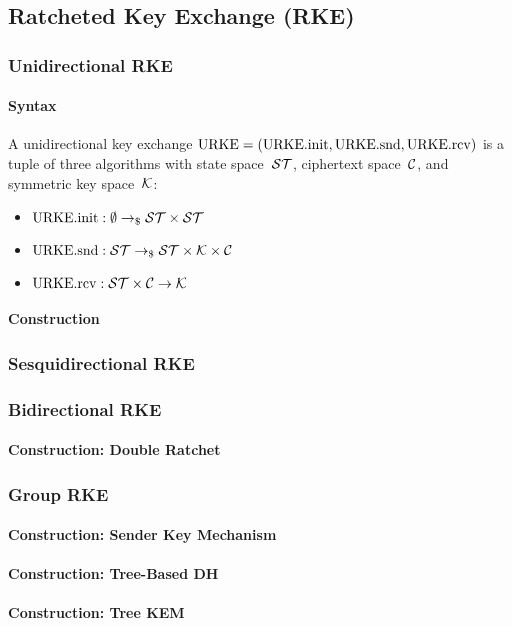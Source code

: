 \documentclass[a4paper,orivec]{llncs}
\begin{document}
\subsection{Ratcheted Key Exchange (RKE)}

\subsubsection{Unidirectional RKE}

\paragraph{Syntax}
A unidirectional key exchange $\mathrm{URKE}=(\mathrm{URKE}.\mathrm{init},\mathrm{URKE}.\mathrm{snd},\mathrm{URKE}.\mathrm{rcv})$ is a tuple of three algorithms with state space~$\mathcal{ST}$, ciphertext space~$\mathcal{C}$, and symmetric key space~$\mathcal{K}$:

\begin{itemize}
    \item $\mathrm{URKE}.\mathrm{init}: \emptyset \to_\$ \mathcal{ST}\times\mathcal{ST}$
    \item $\mathrm{URKE}.\mathrm{snd}: \mathcal{ST} \to_\$ \mathcal{ST}\times\mathcal{K}\times\mathcal{C}$
    \item $\mathrm{URKE}.\mathrm{rcv}: \mathcal{ST}\times\mathcal{C} \to \mathcal{K}$
\end{itemize}

\paragraph{Construction}

\subsubsection{Sesquidirectional RKE}

\subsubsection{Bidirectional RKE}

\paragraph{Construction: Double Ratchet}

\subsubsection{Group RKE}

\paragraph{Construction: Sender Key Mechanism}

\paragraph{Construction: Tree-Based DH}

\paragraph{Construction: Tree KEM}


\end{document}
